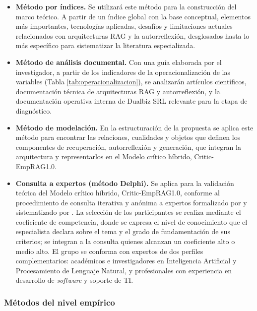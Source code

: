 \begin{itemize}
    \item \textbf{Método por índices.} Se utilizará este método para la construcción del marco teórico. A partir de un índice global con la base conceptual, elementos más importantes, tecnologías aplicadas, desafíos y limitaciones actuales relacionados con arquitecturas RAG y la autorreflexión, desglosados hasta lo más específico para sistematizar la literatura especializada.
    \item \textbf{Método de análisis documental.} Con una guía elaborada por el investigador, a partir de los indicadores de la operacionalización de las variables (Tabla \ref{tab:operacionalizacion}), se analizarán artículos científicos, documentación técnica de arquitecturas RAG y autorreflexión, y la documentación operativa interna de Dualbiz SRL relevante para la etapa de diagnóstico.
    \item \textbf{Método de modelación.} En la estructuración de la propuesta se aplica este método para encontrar las relaciones, cualidades y objetos que definen los componentes de recuperación, autorreflexión y generación, que integran la arquitectura y representarlos en el Modelo crítico híbrido, Critic-EmpRAG1.0.

    \item \textbf{Consulta a expertos (método Delphi).} Se aplica para la validación teórica del Modelo crítico híbrido, Critic-EmpRAG1.0, conforme al procedimiento de consulta iterativa y anónima a expertos formalizado por \textcite{DalkeyHelmer1963delphi} y sistematizado por \textcite{LinstoneTuroff1975delphi}. La selección de los participantes se realiza mediante el coeficiente de competencia, donde se expresa el nivel de conocimiento que el especialista declara sobre el tema y el grado de fundamentación de sus criterios; se integran a la consulta quienes alcanzan un coeficiente alto o medio alto. El grupo se conforma con expertos de dos perfiles complementarios: académicos e investigadores en Inteligencia Artificial y Procesamiento de Lenguaje Natural, y profesionales con experiencia en desarrollo de \textit{software} y soporte de TI. 
\end{itemize}

\subsubsection*{Métodos del nivel empírico}


